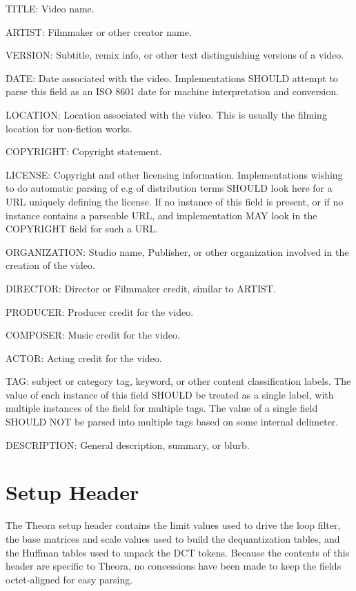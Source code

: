 \documentclass[9pt,letterpaper]{book}
\numberwithin{equation}{chapter}
\numberwithin{figure}{chapter}
\numberwithin{table}{chapter}
\begin{document}
\begin{description}
\item{TITLE:} Video name.
\item{ARTIST:} Filmmaker or other creator name.
\item{VERSION:} Subtitle, remix info, or other text distinguishing
 versions of a video.
\item{DATE:} Date associated with the video. Implementations SHOULD attempt
 to parse this field as an ISO 8601 date for machine interpretation and 
 conversion.
\item{LOCATION:} Location associated with the video. This is usually the
 filming location for non-fiction works.
\item{COPYRIGHT:} Copyright statement.
\item{LICENSE:} Copyright and other licensing information. 
 Implementations wishing to do automatic parsing of e.g
 of distribution terms SHOULD look here for a URL uniquely defining
 the license. If no instance of this field is present, or if no 
 instance contains a parseable URL, and implementation MAY look
 in the COPYRIGHT field for such a URL.
\item{ORGANIZATION:} Studio name, Publisher, or other organization
 involved in the creation of the video.

\item{DIRECTOR:} Director or Filmmaker credit, similar to ARTIST.
\item{PRODUCER:} Producer credit for the video.
\item{COMPOSER:} Music credit for the video.
\item{ACTOR:} Acting credit for the video.

\item{TAG:} subject or category tag, keyword, or other content
 classification labels. The value of each instance of this
 field SHOULD be treated as a single label, with multiple
 instances of the field for multiple tags. The value of
 a single field SHOULD NOT be parsed into multiple tags
 based on some internal delimeter.
\item{DESCRIPTION:} General description, summary, or blurb.
\end{description}

\section{Setup Header}
\label{sec:setupheader}

The Theora setup header contains the limit values used to drive the loop
 filter, the base matrices and scale values used to build the dequantization
 tables, and the Huffman tables used to unpack the DCT tokens.
Because the contents of this header are specific to Theora, no concessions have
 been made to keep the fields octet-aligned for easy parsing.
\end{document}
